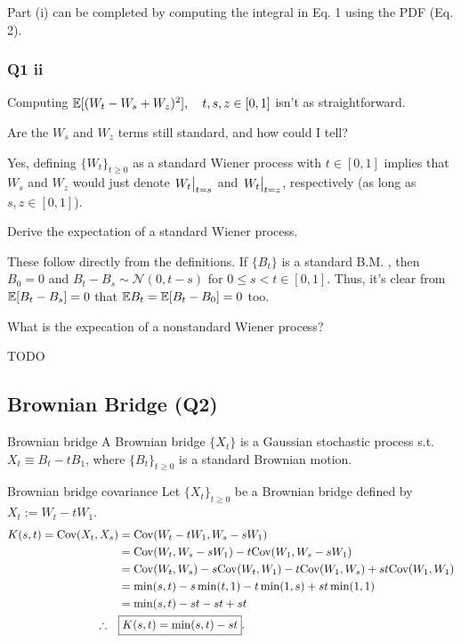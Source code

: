 Part (i) can be completed by computing the integral in Eq. 1 using the PDF (Eq. 2).

\subsubsection*{Q1 ii}

Computing $\mathbb{E}[(W_t - W_s + W_z)^2], \quad t, s, z \in [0, 1]$ isn't as straightforward. 
\begin{quest}
	\item Are the $W_s$ and $W_z$ terms still standard, and how could I tell?
	\begin{ans}
		Yes, defining $\{W_t\}_{t\geq 0}$ as a standard Wiener process with $t\in[0, 1]$ implies that $W_s$ and $W_z$ would just denote  $\eval{W_t}_{t=s}$ and $\eval{W_t}_{t=z}$, respectively (as long as $s, z \in[0, 1]$). 
	\end{ans}
	\item Derive the expectation of a standard Wiener process. 
	\begin{ans}
		These follow directly from the definitions. If $\{B_t\}$ is a standard B.M. , then $B_0 = 0$ and $B_t- B_s \sim \mathcal{N}(0, t-s)$ for $0\leq s <t\in[0, 1]$. Thus, it's clear from $\mathbb{E}[B_t - B_s] = 0$ that $\mathbb{E} B_t = \mathbb{E}[B_t - B_0] = 0$ too.  
	\end{ans}
	\item What is the expecation of a nonstandard Wiener process?
	\begin{ans}
		TODO 
	\end{ans}
\end{quest}

\subsection{Brownian Bridge (Q2)}

\begin{definition}{Brownian bridge}{}
	A Brownian bridge $\{X_t\}$ is a Gaussian stochastic process s.t. $X_t \equiv B_t - tB_1$, where $\{B_t\}_{t\geq 0}$ is a standard Brownian motion.  
\end{definition}

\begin{fact}{Brownian bridge covariance}{}
	Let $\{X_t\}_{t\geq 0}$ be a Brownian bridge defined by $X_t:= W_t - tW_1$.
	\begin{align*}
	K(s,t) = \text{Cov}(X_t, X_s) 
		&= \text{Cov}(W_t - tW_1, W_s - sW_1) \\
		&= \text{Cov}(W_t, W_s - sW_1) -t\text{Cov}(W_1, W_s - s W_1) \\
		&= \text{Cov}(W_t, W_s) -s\text{Cov}(W_t, W_1) 
			-t\text{Cov}(W_1, W_s) + st\text{Cov}(W_1, W_1) \\
		&= \min(s,t) - s\min(t, 1) -t\min(1, s) + st\min(1, 1) \\
		&= \min(s, t) - st - st + st \\
	\therefore\quad& \boxed{ K(s, t) = \min(s, t) - st }.
	\end{align*}
	\end{fact}
	
